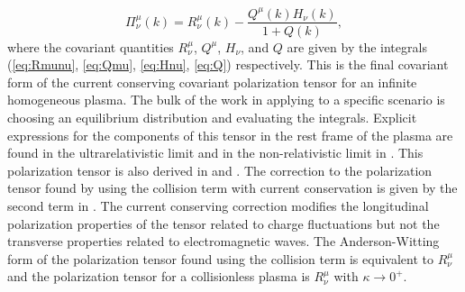 \begin{equation}\label{eq:pimunu}
\boxed{\Pi^\mu_\nu(k) = R^\mu_\nu(k) - \frac{Q^\mu(k) H_\nu(k)}{1+Q(k)},}
\end{equation}
where the covariant quantities $R^\mu_\nu$, $Q^\mu$, $H_\nu$, and $Q$ are given by the integrals (\ref{eq:Rmunu}, \ref{eq:Qmu}, \ref{eq:Hnu}, \ref{eq:Q}) respectively. 
This is the final covariant form of the current conserving covariant polarization tensor for an infinite homogeneous plasma. The bulk of the work in applying  to a specific scenario is choosing an equilibrium distribution and evaluating the integrals. Explicit expressions for the components of this tensor in the rest frame of the plasma are found in the ultrarelativistic limit  and in the non-relativistic limit  in \cite{Formanek:2021blc}.
This polarization tensor is also derived in \cite{Carrington:2003je} and \cite{Schenke:2006xu}. The correction to the polarization tensor found by using the collision term with current conservation  is given by the second term in . The current conserving correction modifies the longitudinal polarization properties of the tensor related to charge fluctuations but not the transverse properties related to electromagnetic waves. The Anderson-Witting form of the polarization tensor found using the collision term  is equivalent to $R^\mu_\nu$ and the polarization tensor for a collisionless plasma is $R^\mu_\nu$ with $\kappa \rightarrow 0^+$.




